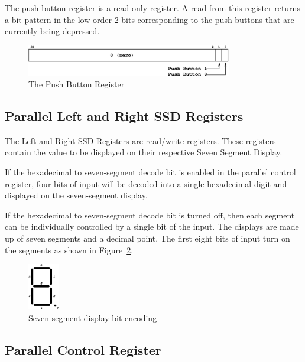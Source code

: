\documentclass[a4paper,10pt]{article}
\begin{document}
The push button register is a read-only register. A read from this
register returns a bit pattern in the low order 2 bits corresponding
to the push buttons that are currently being depressed.

\begin{figure}[h]
\begin{center}
\includegraphics[width=0.8\textwidth]{button_reg.eps}
\caption{The Push Button Register}
\label{button_reg_pic}
\end{center}
\end{figure}

\subsection{Parallel Left and Right SSD Registers}

The Left and Right SSD Registers are read/write registers. These
registers contain the value to be displayed on their respective Seven
Segment Display. 

If the hexadecimal to seven-segment decode bit is enabled in the
parallel control register, four bits of input will be decoded into a
single hexadecimal digit and displayed on the seven-segment display.

If the hexadecimal to seven-segment decode bit is turned off, then
each segment can be individually controlled by a single bit of the
input. The displays are made up of seven segments and a decimal point.
The first eight bits of input turn on the segments as shown in
Figure~\ref{fig:ssd}.

\begin{figure}[h]
\begin{center}
\includegraphics[width=0.12\textwidth]{ssd.eps}
\caption{Seven-segment display bit encoding}
\label{fig:ssd}
\end{center}
\end{figure}

\subsection{Parallel Control Register}
\end{document}
